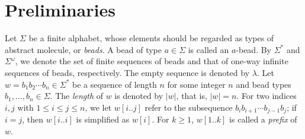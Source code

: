 \documentclass[twocolumn]{svjour3}
\begin{document}
	\section{Preliminaries}


Let $\Sigma$ be a finite alphabet, whose elements should be regarded as types of abstract molecule, or \textit{beads}. 
A bead of type $a \in \Sigma$ is called an $a$-bead. 
By $\Sigma^*$ and $\Sigma^\omega$, we denote the set of finite sequences of beads and that of one-way infinite sequences of beads, respectively. 
The empty sequence is denoted by $\lambda$. 
Let $w = b_1 b_2 \cdots b_n \in \Sigma^*$ be a sequence of length $n$ for some integer $n$ and bead types $b_1, \ldots, b_n \in \Sigma$. 
The \textit{length} of $w$ is denoted by $|w|$, that is, $|w| = n$. %
For two indices $i, j$ with $1 \le i \le j \le n$, we let $w[i..j]$ refer to the subsequence $b_i b_{i+1} \cdots b_{j-1}b_j$; if $i = j$, then $w[i..i]$ is simplified as $w[i]$. 
For $k \ge 1$, $w[1..k]$ is called a \textit{prefix} of $w$. 
\end{document}
